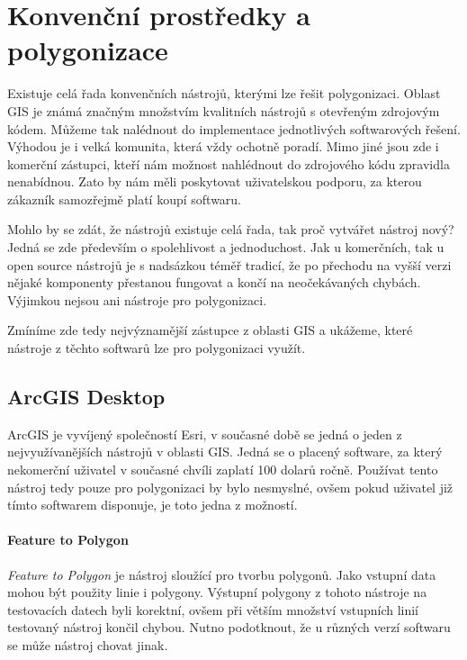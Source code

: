 \chapter{Konvenční prostředky a polygonizace}
\label{chap:konvencni prostredky a polygonizace}
	Existuje celá řada konvenčních nástrojů, kterými lze řešit polygonizaci. Oblast GIS je známá značným množstvím kvalitních nástrojů s otevřeným zdrojovým kódem. Můžeme tak nalédnout do implementace jednotlivých softwarových řešení. Výhodou je i velká komunita, která vždy ochotně poradí. Mimo jiné jsou zde i komerční zástupci, kteří nám možnost nahlédnout do zdrojového kódu zpravidla nenabídnou. Zato by nám měli poskytovat uživatelskou podporu, za kterou zákazník samozřejmě platí koupí softwaru.
	
	Mohlo by se zdát, že nástrojů existuje celá řada, tak proč vytvářet nástroj nový? Jedná se zde především o spolehlivost a jednoduchost. Jak u komerčních, tak u open source nástrojů je s nadsázkou téměř tradicí, že po přechodu na vyšší verzi nějaké komponenty přestanou fungovat a končí na neočekávaných chybách. Výjimkou nejsou ani nástroje pro polygonizaci.
	
	Zmíníme zde tedy nejvýznamější zástupce z oblasti GIS a ukážeme, které nástroje z těchto softwarů lze pro polygonizaci využít.
	
\section{ArcGIS Desktop}
	ArcGIS je vyvíjený společností Esri, v současné době se jedná o jeden z nejvyužívanějších nástrojů v oblasti GIS. Jedná se o placený software, za který nekomerční uživatel v současné chvíli zaplatí 100 dolarů ročně. Používat tento nástroj tedy pouze pro polygonizaci by bylo nesmyslné, ovšem pokud uživatel již tímto softwarem disponuje, je toto jedna z možností.
	
\subsubsection{Feature to Polygon}
	\textit{Feature to Polygon} je nástroj sloužící pro tvorbu polygonů. Jako vstupní data mohou být použity linie i polygony. Výstupní polygony z tohoto nástroje na testovacích datech byli korektní, ovšem při větším množství vstupních linií testovaný nástroj končil chybou. Nutno podotknout, že u různých verzí softwaru se může nástroj chovat jinak.

